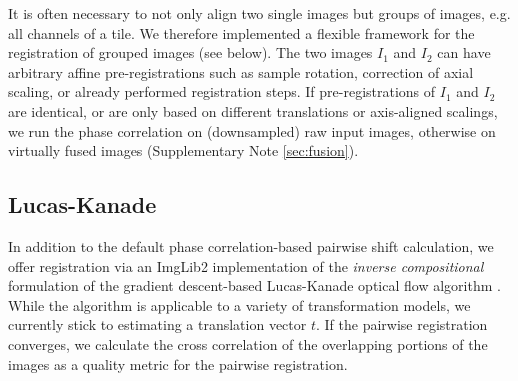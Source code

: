 It is often necessary to not only align two single images but groups of images, e.g. all channels of a tile. We therefore implemented a flexible framework for the registration of grouped images (see below). The two images $I_1$ and $I_2$ can have arbitrary affine pre-registrations such as sample rotation, correction of axial scaling, or already performed registration steps. If pre-registrations of $I_1$ and $I_2$ are identical, or are only based on different translations or axis-aligned scalings, we run the phase correlation on (downsampled) raw input images, otherwise on virtually fused images (Supplementary Note \ref{sec:fusion}).


%

\subsection*{Lucas-Kanade}

In addition to the default phase correlation-based pairwise shift calculation, we offer registration via an ImgLib2 implementation of the \emph{inverse compositional} formulation of the gradient descent-based Lucas-Kanade optical flow algorithm \cite{baker2004lucas}. While the algorithm is applicable to a variety of transformation models, we currently stick to estimating a translation vector $t$. If the pairwise registration converges, we calculate the cross correlation of the overlapping portions of the images as a quality metric for the pairwise registration. 

